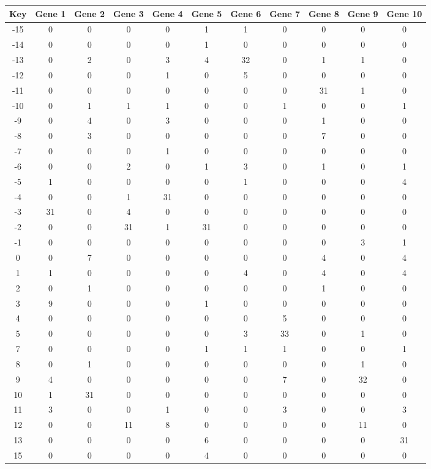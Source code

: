 \begin{tabular}{|c|c|c|c|c|c|c|c|c|c|c|}
\hline
Key & Gene 1 & Gene 2 & Gene 3 & Gene 4 & Gene 5 & Gene 6 & Gene 7 & Gene 8 & Gene 9 & Gene 10 \\
\hline
-15 & 0 & 0 & 0 & 0 & 1 & 1 & 0 & 0 & 0 & 0 \\
-14 & 0 & 0 & 0 & 0 & 1 & 0 & 0 & 0 & 0 & 0 \\
-13 & 0 & 2 & 0 & 3 & 4 & 32 & 0 & 1 & 1 & 0 \\
-12 & 0 & 0 & 0 & 1 & 0 & 5 & 0 & 0 & 0 & 0 \\
-11 & 0 & 0 & 0 & 0 & 0 & 0 & 0 & 31 & 1 & 0 \\
-10 & 0 & 1 & 1 & 1 & 0 & 0 & 1 & 0 & 0 & 1 \\
-9 & 0 & 4 & 0 & 3 & 0 & 0 & 0 & 1 & 0 & 0 \\
-8 & 0 & 3 & 0 & 0 & 0 & 0 & 0 & 7 & 0 & 0 \\
-7 & 0 & 0 & 0 & 1 & 0 & 0 & 0 & 0 & 0 & 0 \\
-6 & 0 & 0 & 2 & 0 & 1 & 3 & 0 & 1 & 0 & 1 \\
-5 & 1 & 0 & 0 & 0 & 0 & 1 & 0 & 0 & 0 & 4 \\
-4 & 0 & 0 & 1 & 31 & 0 & 0 & 0 & 0 & 0 & 0 \\
-3 & 31 & 0 & 4 & 0 & 0 & 0 & 0 & 0 & 0 & 0 \\
-2 & 0 & 0 & 31 & 1 & 31 & 0 & 0 & 0 & 0 & 0 \\
-1 & 0 & 0 & 0 & 0 & 0 & 0 & 0 & 0 & 3 & 1 \\
0 & 0 & 7 & 0 & 0 & 0 & 0 & 0 & 4 & 0 & 4 \\
1 & 1 & 0 & 0 & 0 & 0 & 4 & 0 & 4 & 0 & 4 \\
2 & 0 & 1 & 0 & 0 & 0 & 0 & 0 & 1 & 0 & 0 \\
3 & 9 & 0 & 0 & 0 & 1 & 0 & 0 & 0 & 0 & 0 \\
4 & 0 & 0 & 0 & 0 & 0 & 0 & 5 & 0 & 0 & 0 \\
5 & 0 & 0 & 0 & 0 & 0 & 3 & 33 & 0 & 1 & 0 \\
7 & 0 & 0 & 0 & 0 & 1 & 1 & 1 & 0 & 0 & 1 \\
8 & 0 & 1 & 0 & 0 & 0 & 0 & 0 & 0 & 1 & 0 \\
9 & 4 & 0 & 0 & 0 & 0 & 0 & 7 & 0 & 32 & 0 \\
10 & 1 & 31 & 0 & 0 & 0 & 0 & 0 & 0 & 0 & 0 \\
11 & 3 & 0 & 0 & 1 & 0 & 0 & 3 & 0 & 0 & 3 \\
12 & 0 & 0 & 11 & 8 & 0 & 0 & 0 & 0 & 11 & 0 \\
13 & 0 & 0 & 0 & 0 & 6 & 0 & 0 & 0 & 0 & 31 \\
15 & 0 & 0 & 0 & 0 & 4 & 0 & 0 & 0 & 0 & 0 \\
\hline
\end{tabular}